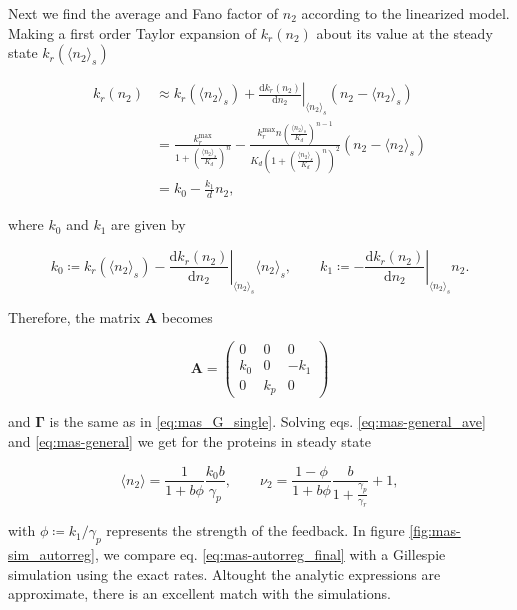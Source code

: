 Next we find the average and Fano factor of $n_2$ according to the linearized model. Making a first order Taylor expansion of $k_r(n_2)$ about its value at the steady state $k_r(\langle n_2\rangle_s)$

\begin{equation}
  \begin{split}
  k_r(n_2) &\approx k_r(\langle n_2\rangle_s) + \left.\frac{\mathrm{d}k_r(n_2)}{\mathrm{d}n_2}\right|_{\langle n_2\rangle_s}\left(n_2-\langle n_2\rangle_s\right)\\
  &=\frac{k_r^{\text{max}}}{1+\left(\frac{\langle n_2\rangle_s}{K_d}\right)^n} - \frac{k_r^{\text{max}}n\left(\frac{\langle n_2\rangle_s}{K_d}\right)^{n-1}}{K_d\left(1+\left(\frac{\langle n_2\rangle_s}{K_d}\right)^n\right)^2}\left(n_2-\langle n_2\rangle_s\right)\\
  &= k_0-\frac{k_1}{d}n_2,
  \end{split}
\end{equation} 

where $k_0$ and $k_1$ are given by

\begin{equation*}
  k_0\coloneqq k_r(\langle n_2\rangle_s) - \left.\frac{\mathrm{d}k_r(n_2)}{\mathrm{d}n_2}\right|_{\langle n_2\rangle_s}\langle n_2\rangle_s,\quad\quad k_1 \coloneqq -\left.\frac{\mathrm{d}k_r(n_2)}{\mathrm{d}n_2}\right|_{\langle n_2\rangle_s}n_2. 
\end{equation*}

Therefore, the matrix $\mathbf{A}$ becomes

\begin{equation*}
  \mathbf{A} =
  \begin{pmatrix}
    0 & 0 & 0 \\
    k_0 & 0 & -k_1 \\
    0 & k_p & 0
  \end{pmatrix}
\end{equation*}

and $\mathbf{\Gamma}$ is the same as in \eqref{eq:mas_G_single}. Solving eqs. \eqref{eq:mas-general_ave} and \eqref{eq:mas-general} we get for the proteins in steady state

\begin{equation}
  \label{eq:mas-autorreg_final}
  \boxed{\langle n_2\rangle = \frac{1}{1+b\phi}\frac{k_0b}{\gamma_p}},\quad\quad \boxed{\nu_2 = \frac{1-\phi}{1+b\phi}\frac{b}{1+\frac{\gamma_p}{\gamma_r}}+1},
\end{equation}

with $\phi\coloneqq k_1/\gamma_p$ represents the strength of the feedback. In figure \ref{fig:mas-sim_autorreg}, we compare eq. \eqref{eq:mas-autorreg_final}  with a Gillespie simulation using the exact rates. Altought the analytic expressions are approximate, there is an excellent match with the simulations.


